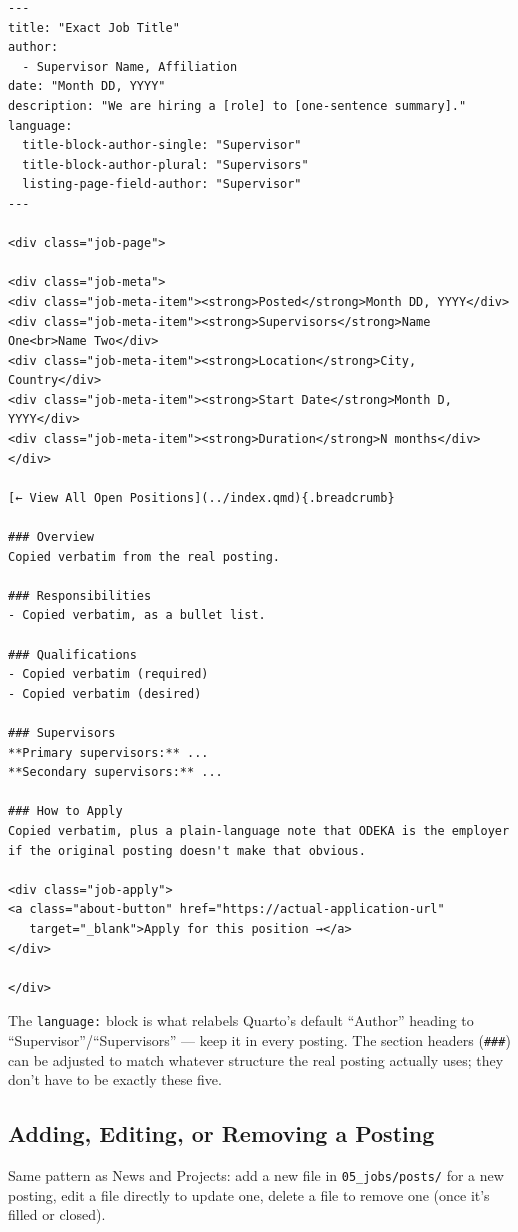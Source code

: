 \documentclass[11pt]{article}
\newcommand{\file}[1]{\texttt{#1}}
\newcommand{\cmd}[1]{\texttt{#1}}
\begin{document}
\begin{lstlisting}
---
title: "Exact Job Title"
author:
  - Supervisor Name, Affiliation
date: "Month DD, YYYY"
description: "We are hiring a [role] to [one-sentence summary]."
language:
  title-block-author-single: "Supervisor"
  title-block-author-plural: "Supervisors"
  listing-page-field-author: "Supervisor"
---

<div class="job-page">

<div class="job-meta">
<div class="job-meta-item"><strong>Posted</strong>Month DD, YYYY</div>
<div class="job-meta-item"><strong>Supervisors</strong>Name One<br>Name Two</div>
<div class="job-meta-item"><strong>Location</strong>City, Country</div>
<div class="job-meta-item"><strong>Start Date</strong>Month D, YYYY</div>
<div class="job-meta-item"><strong>Duration</strong>N months</div>
</div>

[← View All Open Positions](../index.qmd){.breadcrumb}

### Overview
Copied verbatim from the real posting.

### Responsibilities
- Copied verbatim, as a bullet list.

### Qualifications
- Copied verbatim (required)
- Copied verbatim (desired)

### Supervisors
**Primary supervisors:** ...
**Secondary supervisors:** ...

### How to Apply
Copied verbatim, plus a plain-language note that ODEKA is the employer
if the original posting doesn't make that obvious.

<div class="job-apply">
<a class="about-button" href="https://actual-application-url"
   target="_blank">Apply for this position →</a>
</div>

</div>
\end{lstlisting}

The \file{language:} block is what relabels Quarto's default ``Author''
heading to ``Supervisor''/``Supervisors'' --- keep it in every posting.
The section headers (\cmd{\#\#\#}) can be adjusted to match whatever
structure the real posting actually uses; they don't have to be exactly
these five.

\subsection{Adding, Editing, or Removing a Posting}

Same pattern as News and Projects: add a new file in
\file{05\_jobs/posts/} for a new posting, edit a file directly to
update one, delete a file to remove one (once it's filled or closed).
\end{document}
